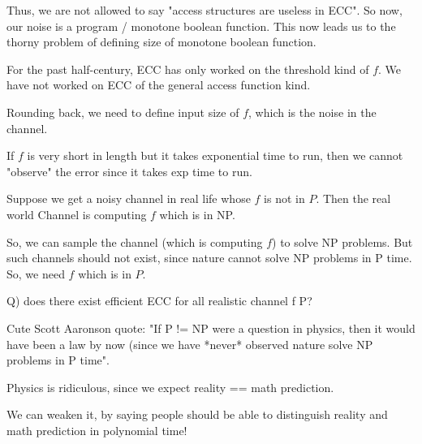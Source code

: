 \begin{itemize}
        Thus, we are not allowed to say "access structures are useless in ECC".
        So now, our noise is a program / monotone boolean function.  This now
        leads us to the thorny problem of defining size of monotone
        boolean function.


        For the past half-century, ECC has only worked on the threshold
        kind of $f$. We have not worked on ECC of the general access
        function kind.

        Rounding back, we need to define input size of $f$, which is the
        noise in the channel.
        
        If $f$ is very short in length but it takes exponential time to run, then we cannot
        "observe" the error since it takes exp time to run.

        Suppose we get a noisy channel in real life whose $f$ is not in $P$. Then the
        real world Channel is computing $f$ which is in NP.
        
        So, we can sample the channel (which is computing $f$) to solve NP
        problems. But such channels should not exist, since nature
        cannot solve NP problems in P time. So, we need
        $f$ which is in $P$.

        Q) does there exist efficient ECC for all realistic channel f \in P?

        Cute Scott Aaronson quote: "If P != NP were a question in physics, then
        it would have been a law by now (since we have *never* observed nature
        solve NP problems in P time".

        
\end{itemize}


Physics is ridiculous, since we expect reality == math prediction.

We can weaken it, by saying people should be able to distinguish reality 
and math prediction in polynomial time!
